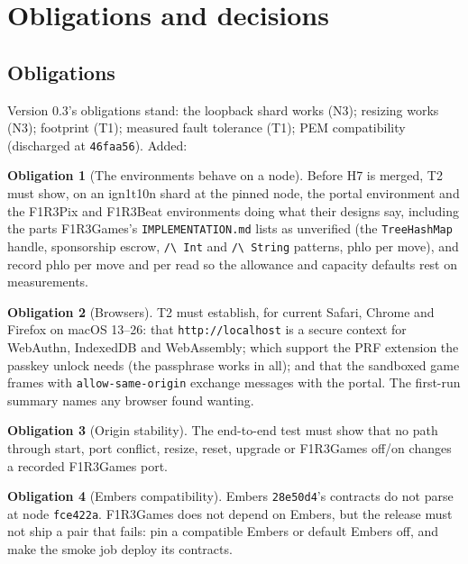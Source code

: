 \documentclass[11pt]{article}
\theoremstyle{definition}
\newtheorem{obligation}{Obligation}
\theoremstyle{remark}
\newcommand{\code}[1]{\texttt{#1}}
\newcommand{\Hr}{ign1t10n}
\newcommand{\Gm}{F1R3Games}
\newcommand{\Em}{Embers}
\begin{document}
\section{Obligations and decisions}\label{sec:open}

\subsection{Obligations}

Version 0.3's obligations stand: the loopback shard works (N3); resizing works (N3);
footprint (T1); measured fault tolerance (T1); PEM compatibility (discharged at
\code{46faa56}). Added:

\begin{obligation}[The environments behave on a node]\label{ob:envs}
Before H7 is merged, T2 must show, on an \Hr{} shard at the pinned node, the portal
environment and the F1R3Pix and F1R3Beat environments doing what their designs say,
including the parts \Gm{}'s \code{IMPLEMENTATION.md} lists as unverified (the
\code{TreeHashMap} handle, sponsorship escrow, \code{/\textbackslash\ Int} and
\code{/\textbackslash\ String} patterns, phlo per move), and record phlo per move and
per read so the allowance and capacity defaults rest on measurements.
\end{obligation}

\begin{obligation}[Browsers]\label{ob:browsers}
T2 must establish, for current Safari, Chrome and Firefox on macOS 13--26: that
\code{http://localhost} is a secure context for WebAuthn, IndexedDB and WebAssembly;
which support the PRF extension the passkey unlock needs (the passphrase works in
all); and that the sandboxed game frames with \code{allow-same-origin} exchange
messages with the portal. The first-run summary names any browser found wanting.
\end{obligation}

\begin{obligation}[Origin stability]\label{ob:origin}
The end-to-end test must show that no path through start, port conflict, resize,
reset, upgrade or \Gm{} off/on changes a recorded \Gm{} port.
\end{obligation}

\begin{obligation}[\Em{} compatibility]\label{ob:embers}
\Em{} \code{28e50d4}'s contracts do not parse at node \code{fce422a}. \Gm{} does not
depend on \Em{}, but the release must not ship a pair that fails: pin a compatible
\Em{} or default \Em{} off, and make the smoke job deploy its contracts.
\end{obligation}
\end{document}
